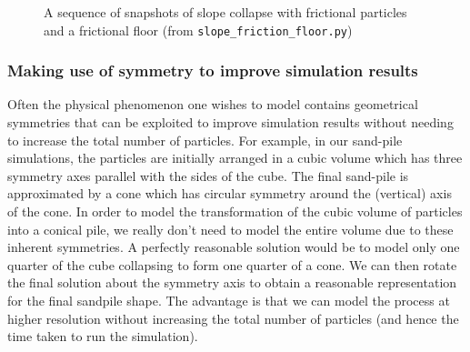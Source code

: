 \begin{figure}
\caption{A sequence of snapshots of slope collapse with frictional particles and a frictional floor (from \texttt{slope\_friction\_floor.py})} \label{fig:slope_friction_floor_pics}
\end{figure}

\subsubsection{Making use of symmetry to improve simulation results}

Often the physical phenomenon one wishes to model contains geometrical symmetries that can be exploited to improve simulation results without needing to increase the total number of particles. For example, in our sand-pile simulations, the particles are initially arranged in a cubic volume which has three symmetry axes parallel with the sides of the cube. The final sand-pile is approximated by a cone which has circular symmetry around the (vertical) axis of the cone. In order to model the transformation of the cubic volume of particles into a conical pile, we really don't need to model the entire volume due to these inherent symmetries. A perfectly reasonable solution would be to model only one quarter of the cube collapsing to form one quarter of a cone. We can then rotate the final solution about the symmetry axis to obtain a reasonable representation for the final sandpile shape. The advantage is that we can model the process at higher resolution without increasing the total number of particles (and hence 
the time taken to run the simulation).

